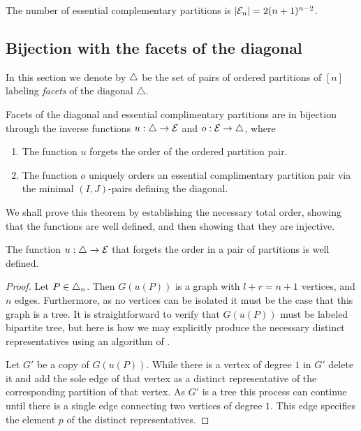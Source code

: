 \begin{corollary}
The number of essential complementary partitions is $|\mathcal{E}_n| = 2(n+1)^{n-2}$.
\end{corollary}

\subsection{Bijection with the facets of the diagonal}

In this section we denote by $\triangle$ be the set of pairs of ordered partitions of $[n]$ labeling \emph{facets} of the diagonal $\triangle$.

\begin{thm}
\label{thm:facets}
Facets of the diagonal and essential complimentary partitions are in bijection through the inverse functions $u:\triangle \to \mathcal{E}$ and $o:\mathcal{E}\to \triangle$, where
\begin{enumerate}
    \item The function $u$ forgets the order of the ordered partition pair.
    \item The function $o$ uniquely orders an essential complimentary partition pair via the minimal $(I,J)$-pairs defining the diagonal. 
\end{enumerate}
\end{thm}
We shall prove this theorem by establishing the necessary total order, showing that the functions are well defined, and then showing that they are injective.

\begin{lemma} 
\label{u well defined}
The function $u:\triangle \to \mathcal{E}$ that forgets the order in a pair of partitions is well defined.
\end{lemma}
\begin{proof}
Let $P \in \triangle_n$. Then $G(u(P))$ is a graph with $l+r=n+1$ vertices, and $n$ edges. Furthermore, as no vertices can be isolated it must be the case that this graph is a tree. 
It is straightforward to verify that $G(u(P))$ must be labeled bipartite tree, but here is how we may explicitly produce the necessary distinct representatives using an algorithm of \cite[Theorem 2]{kajitani1982number}.

Let $G'$ be a copy of $G(u(P))$. 
While there is a vertex of degree $1$ in $G'$ delete it and add the sole edge of that vertex as a distinct representative of the corresponding partition of that vertex. 
As $G'$ is a tree this process can continue until there is a single edge connecting two vertices of degree $1$. 
This edge specifies the element $p$ of the distinct representatives.
\end{proof}

